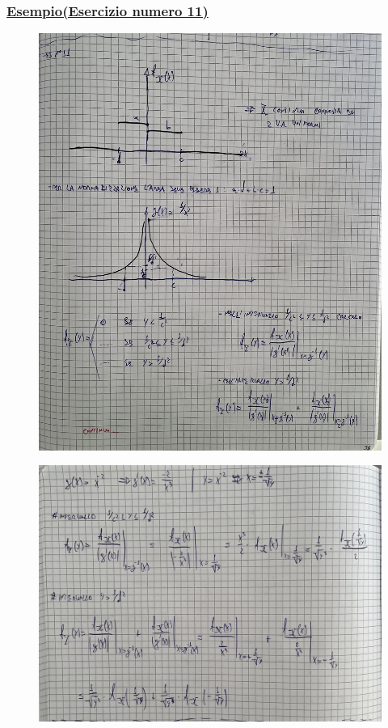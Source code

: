 \documentclass{article}
\begin{document}
\subsubsection{\underline{Esempio(Esercizio numero 11)}}
\begin{figure}[H]
\centering
\includegraphics[scale=0.10]{ese/28.jpeg}
\end{figure}
\begin{figure}[H]
\centering
\includegraphics[scale=0.10]{ese/28a.jpeg}
\end{figure}
\end{document}
